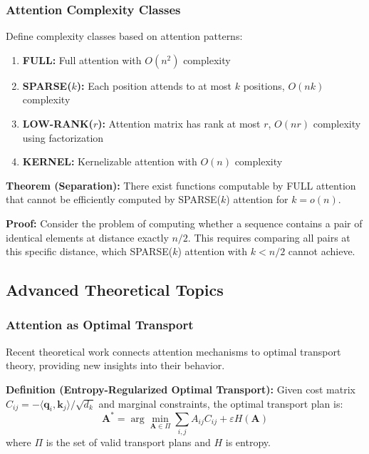 \subsubsection{Attention Complexity Classes}

Define complexity classes based on attention patterns:

\begin{enumerate}
    \item \textbf{FULL:} Full attention with $O(n^2)$ complexity
    \item \textbf{SPARSE($k$):} Each position attends to at most $k$ positions, $O(nk)$ complexity
    \item \textbf{LOW-RANK($r$):} Attention matrix has rank at most $r$, $O(nr)$ complexity using factorization
    \item \textbf{KERNEL:} Kernelizable attention with $O(n)$ complexity
\end{enumerate}

\textbf{Theorem (Separation):} There exist functions computable by FULL attention that cannot be efficiently computed by SPARSE($k$) attention for $k = o(n)$.

\textbf{Proof:} Consider the problem of computing whether a sequence contains a pair of identical elements at distance exactly $n/2$. This requires comparing all pairs at this specific distance, which SPARSE($k$) attention with $k < n/2$ cannot achieve.

\subsection{Advanced Theoretical Topics}

\subsubsection{Attention as Optimal Transport}

Recent theoretical work connects attention mechanisms to optimal transport theory, providing new insights into their behavior.

\textbf{Definition (Entropy-Regularized Optimal Transport):} Given cost matrix $C_{ij} = -\langle \mathbf{q}_i, \mathbf{k}_j \rangle / \sqrt{d_k}$ and marginal constraints, the optimal transport plan is:
\begin{equation}
\mathbf{A}^* = \arg\min_{\mathbf{A} \in \Pi} \sum_{i,j} A_{ij}C_{ij} + \varepsilon H(\mathbf{A})
\end{equation}
where $\Pi$ is the set of valid transport plans and $H$ is entropy.

